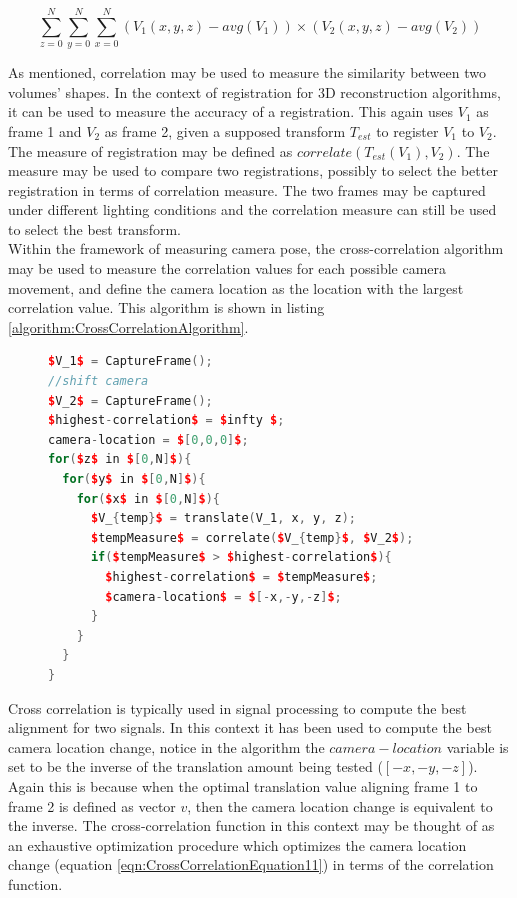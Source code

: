 \begin{equation} \label{eqn:CorrelationEquation}
\sum_{z=0}^{N}\sum_{y=0}^{N}\sum_{x=0}^{N}(V_1(x,y,z)-avg(V_1)) \times (V_2(x,y,z)-avg(V_2))
\end{equation}

As mentioned, correlation may be used to measure the similarity between two volumes' shapes. In the context of registration for 3D reconstruction algorithms, it can be used to measure the accuracy of a registration. This again uses $V_1$ as frame 1 and $V_2$ as frame 2, given a supposed transform $T_{est}$ to register $V_1$ to $V_2$. The measure of registration may be defined as $correlate(T_{est}(V_1), V_2)$. The measure may be used to compare two registrations, possibly to select the better registration in terms of correlation measure. The two frames may be captured under different lighting conditions and the correlation measure can still be used to select the best transform. \\


Within the framework of measuring camera pose, the cross-correlation algorithm may be used to measure the correlation values for each possible camera movement, and define the camera location as the location with the largest correlation value. This algorithm is shown in listing \ref{algorithm:CrossCorrelationAlgorithm}.

\begin{figure}
\begin{lstlisting}[language=c++,caption=Cross-Correlation based camera location estimation,label=algorithm:CrossCorrelationAlgorithm,mathescape,basicstyle=\ttfamily]
$V_1$ = CaptureFrame();
//shift camera
$V_2$ = CaptureFrame();
$highest-correlation$ = $infty $;
camera-location = $[0,0,0]$;
for($z$ in $[0,N]$){
  for($y$ in $[0,N]$){
    for($x$ in $[0,N]$){
      $V_{temp}$ = translate(V_1, x, y, z);
	  $tempMeasure$ = correlate($V_{temp}$, $V_2$);
	  if($tempMeasure$ > $highest-correlation$){
	    $highest-correlation$ = $tempMeasure$;
		$camera-location$ = $[-x,-y,-z]$;
	  }		
	}
  }
}
\end{lstlisting}
\end{figure}

Cross correlation is typically used in signal processing to compute the best alignment for two signals. In this context it has been used to compute the best camera location change, notice in the algorithm the $camera-location$ variable is set to be the inverse of the translation amount being tested ($[-x,-y,-z]$). Again this is because when the optimal translation value aligning frame 1 to frame 2 is defined as vector $v$, then the camera location change is equivalent to the inverse. The cross-correlation function in this context may be thought of as an exhaustive optimization procedure which optimizes the camera location change (equation \ref{eqn:CrossCorrelationEquation11}) in terms of the correlation function.  \\

